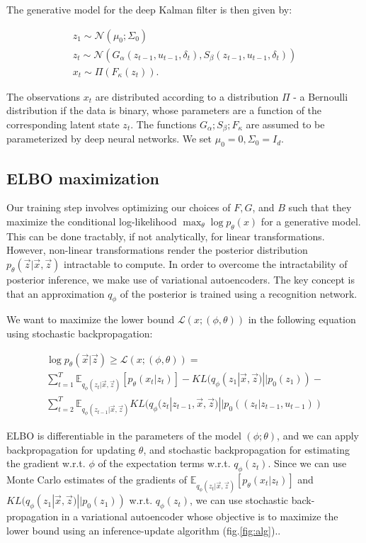 \documentclass{article}
\begin{document}
The generative model for the deep Kalman filter is then given by:

\begin{equation}
\begin{gathered}
z_1 \sim \mathcal{N}(\mu_0; \Sigma_0) \\
z_t \sim \mathcal{N}(G_{\alpha}(z_{t-1},u_{t-1}, \delta_t),S_{\beta}(z_{t-1},u_{t-1}, \delta_t))\\
x_t \sim \Pi(F_{\kappa}(z_t)). 
\end{gathered}
\end{equation}

The observations $x_t$ are distributed according to a distribution $\Pi$ - a Bernoulli distribution if the data is binary, whose parameters are a function of the corresponding latent state $z_t$.
The functions $G_{\alpha}; S_{\beta}; F_{\kappa}$ are assumed to be parameterized
by deep neural networks. We set $\mu_0 = 0, \Sigma_0 = I_d$.

\subsection{ELBO maximization}
\label{sec:elbo}
Our training step involves optimizing our choices of $F, G$, and $B$ such that they maximize the conditional log-likelihood $\max_\theta\log p_\theta(x)$ for a generative model. This can be done tractably, if not analytically, for linear transformations. However, non-linear transformations render the posterior distribution $p_\theta(\vec{z} | \vec{x}, \vec{z})$ intractable to compute. In order to overcome the intractability of posterior inference, we make use of variational autoencoders. The key concept is that an approximation $q_\phi$ of the posterior is trained using a recognition network. 

We want to maximize the lower bound $\mathcal{L}(x;(\phi, \theta))$ in the following equation using stochastic backpropagation:

\begin{gather*}
\log p_\theta(\vec{x}|\vec{z}) \geq \mathcal{L}(x;(\phi, \theta)) = \\
\sum\limits_{t=1}^{T}\mathbb{E}_{q_\phi(z_t|\vec{x}, \vec{z})}[p_\theta(x_t|z_t)] - KL(q_\phi(z_1|\vec{x}, \vec{z})||p_0(z_1)) - \\
\sum\limits_{t=2}^{T}\mathbb{E}_{q_\phi(z_{t-1}|\vec{x}, \vec{z})}KL(q_\phi(z_t|z_{t-1},\vec{x}, \vec{z})||p_0((z_t|z_{t-1}, u_{t-1}))
\end{gather*}

ELBO is differentiable in the parameters of the model $(\phi; \theta)$, and we can apply backpropagation for updating $\theta$, and stochastic backpropagation for estimating the gradient w.r.t. $\phi$ of the expectation terms w.r.t. $q_\phi(z_t)$. Since we can use Monte Carlo estimates of the gradients of $\mathbb{E}_{q_\phi(z_t|\vec{x}, \vec{z})}[p_\theta(x_t|z_t)]$ and $KL(q_\phi(z_1|\vec{x}, \vec{z})||p_0(z_1))$ w.r.t. $q_\phi(z_t)$, we can use stochastic back-propagation in a variational autoencoder whose objective is to maximize the lower bound using an inference-update algorithm (fig.\ref{fig:alg}).. 
\end{document}
